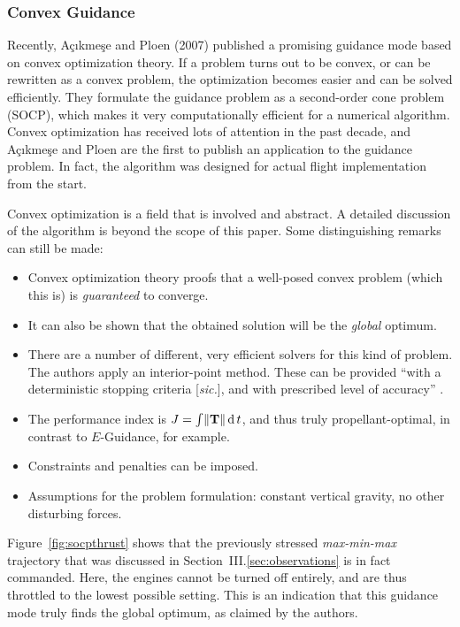 \documentclass[%
]{aiaa-tc}
\begin{document}
\subsubsection{Convex Guidance}

\providecommand{\norm}[1]{\lVert#1\rVert}


Recently, Açıkmeşe and Ploen (2007) published a promising guidance mode based on
convex optimization theory.\cite{Acikmese2007,Boyd2004}  If a problem turns out
to be convex, or can be rewritten as a convex problem, the optimization becomes
easier and can be solved efficiently.  They formulate the guidance problem as a
second-order cone problem (SOCP), which makes it very computationally efficient
for a numerical algorithm.\cite{Lobo1998} Convex optimization has received lots
of attention in the past decade, and Açıkmeşe and Ploen are the first to publish
an application to the guidance problem. In fact, the algorithm was designed for
actual flight implementation from the start.

Convex optimization is a field that is involved and abstract. A detailed
discussion of the algorithm is beyond the scope of this paper. Some
distinguishing remarks can still be made:
\begin{itemize}
    \item Convex optimization theory proofs that a well-posed convex problem
          (which this is) is \emph{guaranteed} to converge.
    \item It can also be shown that the obtained solution will be the
          \emph{global} optimum.
    \item There are a number of different, very efficient solvers for this kind
          of problem. The authors apply an interior-point method.  These can be
          provided ``with a deterministic stopping criteria [\emph{sic.}], and
          with prescribed level of accuracy'' .\cite{Acikmese2007}
    \item The performance index is $J = \int \norm{\mathbf{T}} \ed t$, and
          thus truly propellant-optimal, in contrast to $E$-Guidance, for
          example.
    \item Constraints and penalties can be imposed.
    \item Assumptions for the problem formulation: constant vertical gravity, no
          other disturbing forces.
\end{itemize} 

Figure~\ref{fig:socpthrust} shows that  the previously stressed
\emph{max-min-max} trajectory that was discussed in
Section~III.\ref{sec:observations} is in fact commanded. Here, the engines cannot be
turned off entirely, and are thus throttled to the lowest possible setting. This
is an indication that this guidance mode truly finds the global optimum, as
claimed by the authors.
\end{document}
